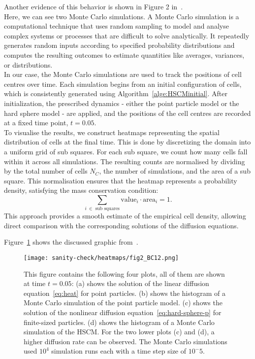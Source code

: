 Another evidence of this behavior is shown in Figure 2 in~\cite{Bruna2012}. \\
Here, we can see two Monte Carlo simulations. 
A Monte Carlo simulation is a computational technique that uses random sampling to model and analyse complex systems or processes that are difficult to solve analytically. 
It repeatedly generates random inputs according to specified probability distributions and computes the resulting outcomes to estimate quantities like averages, variances, or distributions. \\
In our case, the Monte Carlo simulations are used to track the positions of cell centres over time. 
Each simulation begins from an initial configuration of cells, which is consistently generated using Algorithm~\ref{alge:HSCMinitial}. 
After initialization, the prescribed dynamics - either the point particle model or the hard sphere model - are applied, and the positions of the cell centres are recorded at a fixed time point, $t=0.05$. \\
To visualise the results, we construct heatmaps representing the spatial distribution of cells at the final time. 
This is done by discretizing the domain into a uniform grid of sub squares. 
For each sub square, we count how many cells fall within it across all simulations. 
The resulting counts are normalised by dividing by the total number of cells $N_C$, the number of simulations, and the area of a sub square. This normalisation ensures that the heatmap represents a probability density, satisfying the mass conservation condition: \[\sum\limits_{i \: \in \text{ sub squares}} \text{value}_i \cdot \text{area}_i = 1. \]
This approach provides a smooth estimate of the empirical cell density, allowing direct comparison with the corresponding solutions of the diffusion equations.

Figure~\ref{fig:fig2BC12} shows the discussed graphic from~\cite{Bruna2012}. 
\begin{figure}
	\centering
    \texttt{[image: sanity-check/heatmaps/fig2\_BC12.png]}
    \caption{
    This figure contains the following four plots, all of them are shown at time \( t=0.05 \): \newline
    \hspace*{0.5em}(a) shows the solution of the linear diffusion equation~\ref{eq:heat} for point particles. \newline
    \hspace*{0.5em}(b) shows the histogram of a Monte Carlo simulation of the point particle model. \newline
    \hspace*{0.5em}(c) shows the solution of the nonlinear diffusion equation~\ref{eq:hard-sphere-p} for finite-sized particles. \newline
    \hspace*{0.5em}(d) shows the histogram of a Monte Carlo simulation of the HSCM. \newline
    For the two lower plots (c) and (d), a higher diffusion rate can be observed. 
    The Monte Carlo simulations used $10^4$ simulation runs each with a time step size of $10^-5$.
    }
    \label{fig:fig2BC12}
\end{figure}

